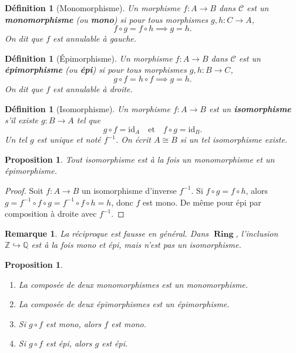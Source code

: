 \documentclass[a4paper,12pt]{book}
\DeclareMathOperator{\Ring}{\mathbf{Ring}}
\newcommand{\id}{\mathrm{id}}
\newcommand{\Z}{\mathbb{Z}}
\newcommand{\Q}{\mathbb{Q}}
\newtheorem{proposition}[theoreme]{Proposition}
\newtheorem{definition}[theoreme]{Définition}
\newtheorem*{remarque}{Remarque}
\begin{document}
\begin{definition}[Monomorphisme]\label{def:mono}
Un morphisme $f : A \to B$ dans $\mathcal{C}$ est un \textbf{monomorphisme} (ou \textbf{mono}) si pour tous morphismes $g, h : C \to A$,
\[
  f \circ g = f \circ h \implies g = h.
\]
On dit que $f$ est \emph{annulable à gauche}.
\end{definition}

\begin{definition}[Épimorphisme]\label{def:epi}
Un morphisme $f : A \to B$ dans $\mathcal{C}$ est un \textbf{épimorphisme} (ou \textbf{épi}) si pour tous morphismes $g, h : B \to C$,
\[
  g \circ f = h \circ f \implies g = h.
\]
On dit que $f$ est \emph{annulable à droite}.
\end{definition}

\begin{definition}[Isomorphisme]\label{def:iso}
Un morphisme $f : A \to B$ est un \textbf{isomorphisme} s'il existe $g : B \to A$ tel que
\[
  g \circ f = \id_A \quad \text{et} \quad f \circ g = \id_B.
\]
Un tel $g$ est unique et noté $f^{-1}$. On écrit $A \cong B$\index{$\cong$} si un tel isomorphisme existe.
\end{definition}

\begin{proposition}\label{prop:iso-mono-epi}
Tout isomorphisme est à la fois un monomorphisme et un épimorphisme.
\end{proposition}

\begin{proof}
Soit $f : A \to B$ un isomorphisme d'inverse $f^{-1}$. Si $f \circ g = f \circ h$, alors $g = f^{-1} \circ f \circ g = f^{-1} \circ f \circ h = h$, donc $f$ est mono. De même pour épi par composition à droite avec $f^{-1}$.
\end{proof}

\begin{remarque}
La réciproque est fausse en général. Dans $\Ring$, l'inclusion $\Z \hookrightarrow \Q$ est à la fois mono et épi, mais n'est pas un isomorphisme.
\end{remarque}

\begin{proposition}\label{prop:comp-mono-epi}
\begin{enumerate}[label=(\roman*)]
  \item La composée de deux monomorphismes est un monomorphisme.
  \item La composée de deux épimorphismes est un épimorphisme.
  \item Si $g \circ f$ est mono, alors $f$ est mono.
  \item Si $g \circ f$ est épi, alors $g$ est épi.
\end{enumerate}
\end{proposition}
\end{document}
